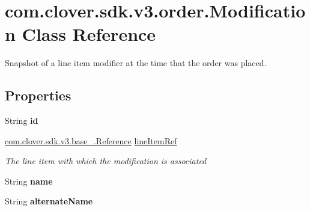 \hypertarget{classcom_1_1clover_1_1sdk_1_1v3_1_1order_1_1_modification}{}\section{com.\+clover.\+sdk.\+v3.\+order.\+Modification Class Reference}
\label{classcom_1_1clover_1_1sdk_1_1v3_1_1order_1_1_modification}


Snapshot of a line item modifier at the time that the order was placed.  


\subsection*{Properties}
\begin{DoxyCompactItemize}
\item 
\mbox{\label{classcom_1_1clover_1_1sdk_1_1v3_1_1order_1_1_modification_a3dc32c042258d72f7cc06b64edfa5f36}} 
String {\bfseries id}
\item 
\hyperlink{classcom_1_1clover_1_1sdk_1_1v3_1_1base___1_1_reference}{com.\+clover.\+sdk.\+v3.\+base\+\_\+.\+Reference} \hyperlink{classcom_1_1clover_1_1sdk_1_1v3_1_1order_1_1_modification_ae10602350c922aa9befc99465fe86a3f}{line\+Item\+Ref}
\begin{DoxyCompactList}\small\item\em The line item with which the modification is associated \end{DoxyCompactList}\item 
\mbox{\label{classcom_1_1clover_1_1sdk_1_1v3_1_1order_1_1_modification_a84546632f263029c7a5619695654f077}} 
String {\bfseries name}
\item 
\mbox{\label{classcom_1_1clover_1_1sdk_1_1v3_1_1order_1_1_modification_abbb9955f6f35a2a051afdd5a124553dc}} 
String {\bfseries alternate\+Name}

\end{DoxyCompactItemize}
